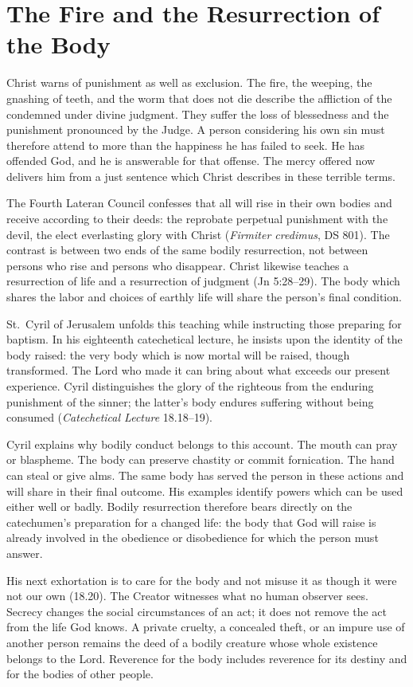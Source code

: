 \section{The Fire and the Resurrection of the Body}

Christ warns of punishment as well as exclusion. The fire, the weeping, the gnashing of teeth, and the worm that does not die describe the affliction of the condemned under divine judgment. They suffer the loss of blessedness and the punishment pronounced by the Judge. A person considering his own sin must therefore attend to more than the happiness he has failed to seek. He has offended God, and he is answerable for that offense. The mercy offered now delivers him from a just sentence which Christ describes in these terrible terms.

The Fourth Lateran Council confesses that all will rise in their own bodies and receive according to their deeds: the reprobate perpetual punishment with the devil, the elect everlasting glory with Christ (\emph{Firmiter credimus}, DS 801). The contrast is between two ends of the same bodily resurrection, not between persons who rise and persons who disappear. Christ likewise teaches a resurrection of life and a resurrection of judgment (Jn 5:28--29). The body which shares the labor and choices of earthly life will share the person's final condition.

St.~Cyril of Jerusalem unfolds this teaching while instructing those preparing for baptism. In his eighteenth catechetical lecture, he insists upon the identity of the body raised: the very body which is now mortal will be raised, though transformed. The Lord who made it can bring about what exceeds our present experience. Cyril distinguishes the glory of the righteous from the enduring punishment of the sinner; the latter's body endures suffering without being consumed (\emph{Catechetical Lecture} 18.18--19).

Cyril explains why bodily conduct belongs to this account. The mouth can pray or blaspheme. The body can preserve chastity or commit fornication. The hand can steal or give alms. The same body has served the person in these actions and will share in their final outcome. His examples identify powers which can be used either well or badly. Bodily resurrection therefore bears directly on the catechumen's preparation for a changed life: the body that God will raise is already involved in the obedience or disobedience for which the person must answer.

His next exhortation is to care for the body and not misuse it as though it were not our own (18.20). The Creator witnesses what no human observer sees. Secrecy changes the social circumstances of an act; it does not remove the act from the life God knows. A private cruelty, a concealed theft, or an impure use of another person remains the deed of a bodily creature whose whole existence belongs to the Lord. Reverence for the body includes reverence for its destiny and for the bodies of other people.

